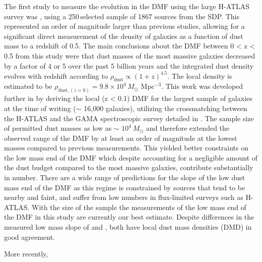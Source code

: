 The first study to measure the evolution in the DMF using the large H-ATLAS survey was \citealt{Dunne_2011}, using a 250\,\micron selected sample of 1867 sources from the SDP. This represented an order of magnitude larger than previous studies, allowing for a significant direct measurement of the density of galaxies as a function of dust mass to a redshift of 0.5. The main conclusions about the DMF between 0 < z < 0.5 from this study were that dust masses of the most massive galaxies decreased by a factor of 4 or 5 over the past 5 billion years and the integrated dust density evolves with redshift according to $\rho_{\textrm{dust}} \propto (1+z)^{4.5}$. The local density is estimated to be $\rho_{\textrm{dust}, (z=0)} = 9.8\times10^4$\,$M_\odot$ Mpc$^{-3}$. This work was developed further in \citealt{Beeston_2018} by deriving the local (z < 0.1) DMF for the largest sample of galaxies at the time of writing ($\sim$ 16,000 galaxies), utilizing the crossmatching between the H-ATLAS and the GAMA spectroscopic survey detailed in \citealt{Bourne_2016}. The sample size of \citealt{Beeston_2018} permitted dust masses as low as $\sim$ $10^4$\,$M_\odot$ and therefore extended the observed range of the DMF by at least an order of magnitude at the lowest masses compared to previous measurements. This yielded better constraints on the low mass end of the DMF which despite accounting for a negligible amount of the dust budget compared to the most massive galaxies, contribute substantially in number. There are a wide range of predictions for the slope of the low dust mass end of the DMF as this regime is constrained by sources that tend to be nearby and faint, and suffer from low numbers in flux-limited surveys such as H-ATLAS. With the size of the \citealt{Beeston_2018} sample the measurements of the low mass end of the DMF in this study are currently our best estimate. Despite differences in the measured low mass slope of \citealt{Dunne_2011} and \citealt{Beeston_2018}, both have local dust mass densities (DMD) in good agreement.

More recently, \citealt{Driver_2018}

